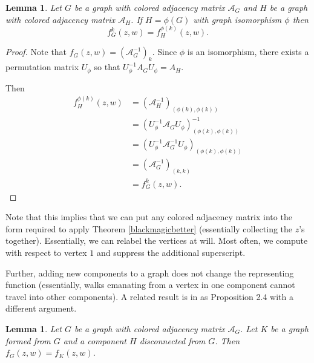 \documentclass[12pt]{amsart}
\newtheorem{lemma}[theorem]{Lemma}
\theoremstyle{remark}
\newcommand{\inv}{^{-1}}
\numberwithin{equation}{section}
\newcommand{\cA}{\mathcal{A}}
\begin{document}
\begin{lemma}\label{relabel}
    Let $G$ be a graph with colored adjacency matrix $\cA_G$ and $H$ be a graph with colored adjacency matrix $\mathcal{A}_H$. If $H = \phi(G)$ with graph isomorphism $\phi$ then 
    $$f^k_G(z,w) = f^{\phi(k)}_H(z,w).$$
\end{lemma}

\begin{proof}
    Note that $f_G(z,w) = (\cA_G^{-1})_k$. Since $\phi$ is an isomorphism, there exists a permutation matrix $U_\phi$ so that $U_{\phi}\inv A_G U_\phi = A_H$. 
 
    Then 
    \begin{align*}
    f^{\phi(k)}_H(z,w) &= (\cA_H\inv)_{(\phi(k),\phi(k))} \\
    &= (U_{\phi}^{-1} \cA_G U_{\phi})^{-1}_{(\phi(k),\phi(k))} \\
    &= (U_{\phi}^{-1}\cA_G^{-1}U_{\phi})_{(\phi(k),\phi(k))}\\
    &= (\cA_G\inv)_{(k,k)} \\
    &= f_G^k(z,w).
    \end{align*}
\end{proof}

Note that this implies that we can put any colored adjacency matrix into the form required to apply Theorem \ref{blackmagicbetter} (essentially collecting the $z$'s together). Essentially, we can relabel the vertices at will. Most often, we compute with respect to vertex $1$ and suppress the additional superscript.


Further, adding new components to a graph does not change the representing function (essentially, walks emanating from a vertex in one component cannot travel into other components). A related result is in \cite{bickelhong} as Proposition 2.4 with a different argument.

\begin{lemma} \label{connectedcomponent}
    Let $G$ be a graph with colored adjacency matrix $\cA_G$. Let $K$ be a graph formed from $G$ and a component $H$ disconnected from $G$. Then $f_G(z,w) = f_K(z,w)$. 
\end{lemma}
\end{document}
